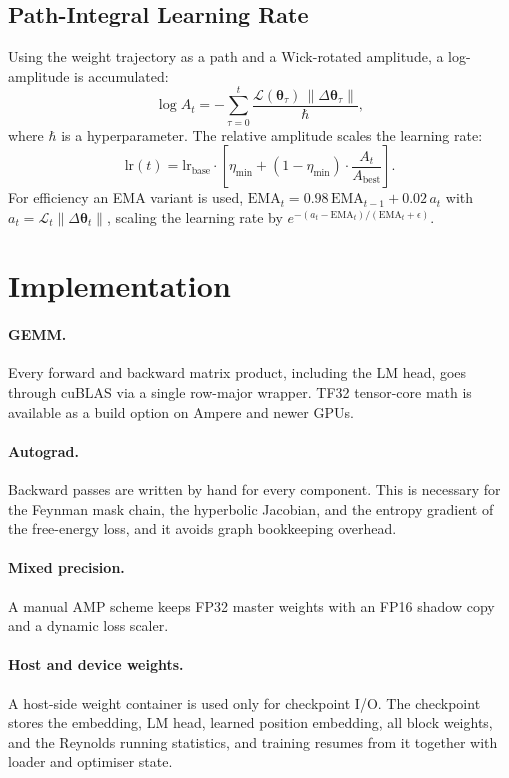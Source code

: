\documentclass[11pt,a4paper]{article}
\newcommand{\calL}{\mathcal{L}}
\newcommand{\btheta}{\bm{\theta}}
\begin{document}
\subsection{Path-Integral Learning Rate}
\label{sec:path_integral}

Using the weight trajectory as a path and a Wick-rotated amplitude, a
log-amplitude is accumulated:
\begin{equation}
  \log A_t = -\sum_{\tau=0}^{t} \frac{\calL(\btheta_\tau)\,\|\Delta\btheta_\tau\|}{\hbar},
\end{equation}
where $\hbar$ is a hyperparameter. The relative amplitude scales the
learning rate:
\begin{equation}
  \text{lr}(t) = \text{lr}_{\text{base}}\cdot
  \left[\eta_{\min} + (1-\eta_{\min})\cdot\frac{A_t}{A_{\text{best}}}\right].
\end{equation}
For efficiency an EMA variant is used,
$\text{EMA}_t = 0.98\,\text{EMA}_{t-1} + 0.02\,a_t$ with
$a_t=\calL_t\|\Delta\btheta_t\|$, scaling the learning rate by
$e^{-(a_t-\text{EMA}_t)/(\text{EMA}_t+\epsilon)}$.

\section{Implementation}
\label{sec:impl}

\paragraph{GEMM.}
Every forward and backward matrix product, including the LM head, goes
through cuBLAS via a single row-major wrapper. TF32 tensor-core math is
available as a build option on Ampere and newer GPUs.

\paragraph{Autograd.}
Backward passes are written by hand for every component. This is
necessary for the Feynman mask chain, the hyperbolic Jacobian, and the
entropy gradient of the free-energy loss, and it avoids graph
bookkeeping overhead.

\paragraph{Mixed precision.}
A manual AMP scheme keeps FP32 master weights with an FP16 shadow copy
and a dynamic loss scaler.

\paragraph{Host and device weights.}
A host-side weight container is used only for checkpoint I/O. The
checkpoint stores the embedding, LM head, learned position embedding,
all block weights, and the Reynolds running statistics, and training
resumes from it together with loader and optimiser state.
\end{document}
